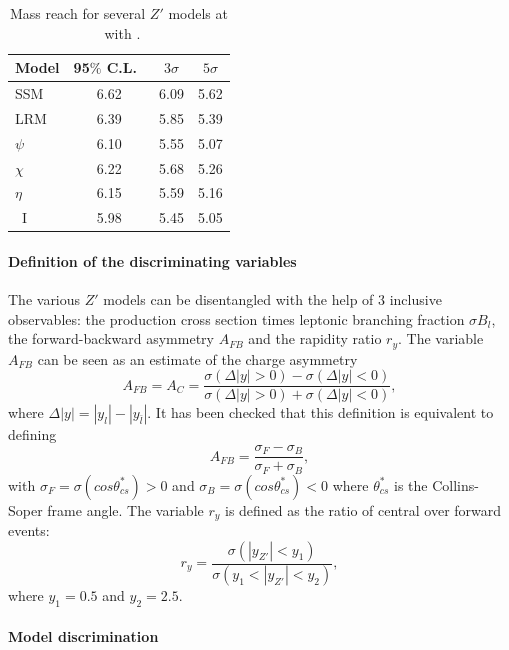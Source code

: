 \documentclass[a4paper,11pt]{article}
\newcommand*{\cl}{C.L.~}
\begin{document}
%
\begin{table}
\centering
\begin{tabular}{|l|c|c|c|} \hline\hline
  Model &   95$\%$ \cl  &  $3\sigma$  & $5\sigma$   \\
\hline
SSM    &     6.62     &  6.09    &  5.62     \\
LRM    &   6.39     & 5.85     & 5.39  \\
$\psi$    &  6.10   & 5.55   & 5.07  \\
$\chi$   &  6.22    & 5.68    & 5.26   \\
$\eta$   &  6.15     &  5.59  &  5.16   \\
~I        & 5.98   &  5.45   &  5.05  \\
\hline\hline
\end{tabular}
\caption{ Mass reach for several $Z'$ models at \sqrtslhc\ with \intlumihllhc. }
\label{tab:pheno:spec}
\end{table}
%
\paragraph*{Definition of the discriminating variables}
\label{par:vardef}

The various $Z'$ models can be disentangled with the help of 3 inclusive observables: the production cross section times leptonic branching fraction $\sigma B_l$, the forward-backward asymmetry $A_{FB}$ and the rapidity ratio $r_y$. The variable $A_{FB}$ can be seen as an estimate of the charge asymmetry
\begin{equation}
A_{FB} = A_C =  \frac{\sigma(\Delta|y| > 0) - \sigma(\Delta|y| < 0)}{\sigma(\Delta|y| > 0) + \sigma(\Delta|y| < 0)},
\end{equation}
where $\Delta|y| = |y_l| - |y_{\bar{l}}|$. It has been checked that this definition is equivalent to defining
\begin{equation}
A_{FB} = \frac{\sigma_F - \sigma_B}{\sigma_F + \sigma_B},
\end{equation}
with $\sigma_F = \sigma (cos\theta^{*}_{cs})>0$ and $\sigma_B = \sigma (cos\theta^{*}_{cs})<0$ where $\theta^*_{cs}$ is the Collins-Soper frame angle. The variable $r_y$ is defined as the ratio of central over forward events:
\begin{equation}
r_y = \frac{\sigma(|y_{Z'}| < y_1)}{\sigma(y_1 < |y_{Z'}| <y_2)},
\end{equation}
where $y_1=0.5$ and $y_2=2.5$.

\paragraph*{Model discrimination}
\end{document}
